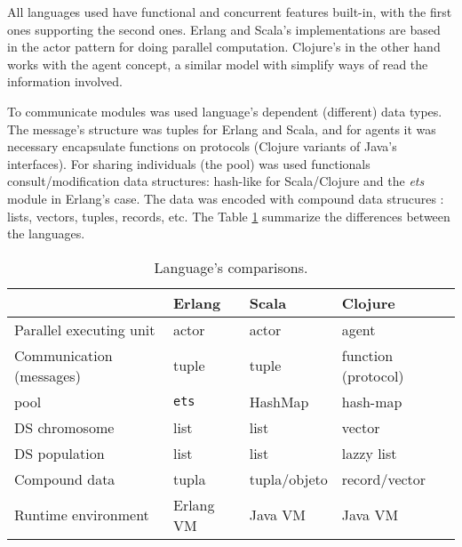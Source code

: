 
All languages used have functional and concurrent features built-in, with the first ones supporting the second ones. Erlang and Scala’s implementations are based in the actor pattern for doing parallel computation. Clojure’s in the other hand works with the agent concept, a similar model with simplify ways of read the information involved.

To communicate modules was used language’s dependent (different) data types. The message’s structure was tuples for Erlang and Scala, and for agents it was necessary encapsulate functions on protocols (Clojure variants of Java’s interfaces). For sharing individuals (the pool) was used functionals consult/modification data structures: hash-like for Scala/Clojure and the {\em ets} module in Erlang’s case. The data was encoded with compound data strucures : lists, vectors, tuples, records, etc. The Table \ref{tb:res:comp} summarize the differences between the languages.

\begin{table}
  \caption{Language's comparisons.}\label{tb:res:comp}
  \centering
  \begin{tabular}{|p{4cm}|>{\centering}p{3cm}|>{\centering}p{3cm}|>{\centering}p{3cm}|}
    \hline
     & \textbf{Erlang} & \textbf{Scala} & \textbf{Clojure} \tabularnewline
    \hline
    Parallel executing unit & actor & actor & agent \tabularnewline
    \hline
    Communication (messages) & tuple & tuple & function (protocol) \tabularnewline
    \hline
    pool & \texttt{ets} & HashMap & hash-map \tabularnewline
    \hline
    DS chromosome & list & list & vector \tabularnewline
    \hline
    DS population & list & list & lazzy list \tabularnewline
    \hline
    Compound data & tupla & tupla/objeto & record/vector \tabularnewline
    \hline
    Runtime environment & Erlang VM& Java VM& Java VM \tabularnewline
    \hline
  \end{tabular}

\end{table}


